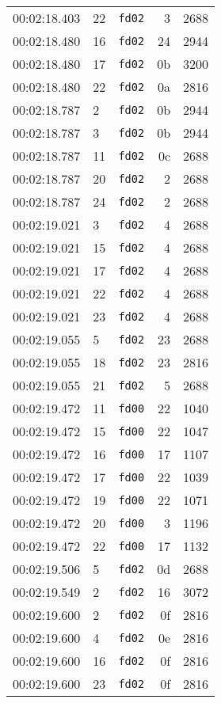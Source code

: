 \documentclass{article}
\begin{document}
\begin{longtable}{lllrr}
00:02:18.403 & 22 & \texttt{fd02} & 3 & 2688 \\
00:02:18.480 & 16 & \texttt{fd02} & 24 & 2944 \\
00:02:18.480 & 17 & \texttt{fd02} & 0b & 3200 \\
00:02:18.480 & 22 & \texttt{fd02} & 0a & 2816 \\
00:02:18.787 & 2 & \texttt{fd02} & 0b & 2944 \\
00:02:18.787 & 3 & \texttt{fd02} & 0b & 2944 \\
00:02:18.787 & 11 & \texttt{fd02} & 0c & 2688 \\
00:02:18.787 & 20 & \texttt{fd02} & 2 & 2688 \\
00:02:18.787 & 24 & \texttt{fd02} & 2 & 2688 \\
00:02:19.021 & 3 & \texttt{fd02} & 4 & 2688 \\
00:02:19.021 & 15 & \texttt{fd02} & 4 & 2688 \\
00:02:19.021 & 17 & \texttt{fd02} & 4 & 2688 \\
00:02:19.021 & 22 & \texttt{fd02} & 4 & 2688 \\
00:02:19.021 & 23 & \texttt{fd02} & 4 & 2688 \\
00:02:19.055 & 5 & \texttt{fd02} & 23 & 2688 \\
00:02:19.055 & 18 & \texttt{fd02} & 23 & 2816 \\
00:02:19.055 & 21 & \texttt{fd02} & 5 & 2688 \\
00:02:19.472 & 11 & \texttt{fd00} & 22 & 1040 \\
00:02:19.472 & 15 & \texttt{fd00} & 22 & 1047 \\
00:02:19.472 & 16 & \texttt{fd00} & 17 & 1107 \\
00:02:19.472 & 17 & \texttt{fd00} & 22 & 1039 \\
00:02:19.472 & 19 & \texttt{fd00} & 22 & 1071 \\
00:02:19.472 & 20 & \texttt{fd00} & 3 & 1196 \\
00:02:19.472 & 22 & \texttt{fd00} & 17 & 1132 \\
00:02:19.506 & 5 & \texttt{fd02} & 0d & 2688 \\
00:02:19.549 & 2 & \texttt{fd02} & 16 & 3072 \\
00:02:19.600 & 2 & \texttt{fd02} & 0f & 2816 \\
00:02:19.600 & 4 & \texttt{fd02} & 0e & 2816 \\
00:02:19.600 & 16 & \texttt{fd02} & 0f & 2816 \\
00:02:19.600 & 23 & \texttt{fd02} & 0f & 2816 \\

\end{longtable}
\end{document}
